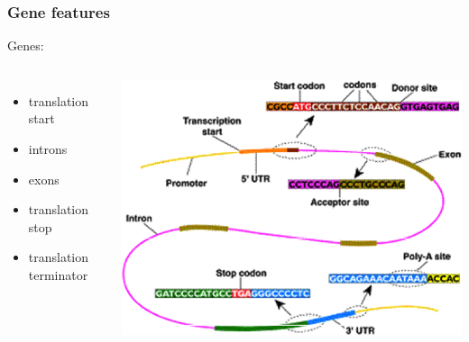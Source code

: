 
%
\begin{frame}
  \frametitle{Gene features}
  \textcolor{hutton_green}{Genes:}
  \begin{columns}[T] 
      \begin{itemize}
        \item translation start
        \item introns
        \item exons
        \item translation stop
        \item translation terminator
      \end{itemize}
      \includegraphics[width=\textwidth]{images/gene_feature}
  \end{columns}    
\end{frame}

